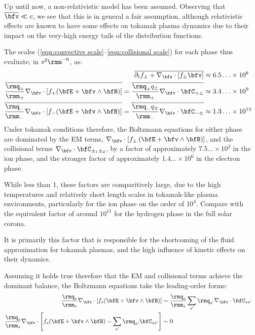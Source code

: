     \begin{remark}
        Up until now, a non-relativistic model has been assumed. Observing that $\overline{\bfv}  \ll  c$, we see that this is in general a fair assumption, although relativistic effects are known to have some effects on tokamak plasma dynamics due to their impact on the very-high energy tails of the distribution functions.
    \end{remark}
    
    The scales (\ref{eqn:convective scale}--\ref{eqn:collisional scale}) for each phase thus evaluate, in $s^{2}\rmm^{- 6}$, as:
    \begin{align}
        \overline{\partial_{t}f_{\pm} + \nabla_{\bfx}\cdot[f_{\pm}\bfv]}  &\approx  6.5\ldots\times 10^{6}  \\
        \overline{\frac{\rmq_{+}}{\rmm_{+}}\nabla_{\bfv}\cdot[f_{+}(\bfE + \bfv\wedge\bfB)]}  =  \overline{\frac{\rmq_{+}q_{\pm}}{\rmm_{+}}\nabla_{\bfv}\cdot\bfC_{+\pm}}  &\approx  3.4\ldots\times 10^{9}  \\
        \overline{\frac{\rmq_{-}}{\rmm_{-}}\nabla_{\bfv}\cdot[f_{-}(\bfE + \bfv\wedge\bfB)]}  =  \overline{\frac{\rmq_{-}q_{\pm}}{\rmm_{-}}\nabla_{\bfv}\cdot\bfC_{-\pm}}  &\approx  1.3\ldots\times 10^{13}
    \end{align}
    Under tokamak conditions therefore, the Boltzmann equations for either phase are dominated by the EM terms, $\nabla_{\bfv}\cdot[f_{\pm}\left(\bfE + \bfv\wedge\bfB\right)]$, and the collisional terms $\nabla_{\bfv}\cdot\bfC_{\pm_{1}\pm_{2}}$, by a factor of approximately $7.5\ldots\times 10^{2}$ in the ion phase, and the stronger factor of approximately $1.4\ldots\times 10^{6}$ in the electron phase. 

    \begin{remark}
        While less than 1, these factors are comparitively large, due to the high temperatures and relatively short length scales in tokamak-like plasma environments, particularly for the ion phase on the order of $10^{3}$. Compare with the equivalent factor of around $10^{11}$ for the hydrogen phase in the full solar corona.

        It is primarily this factor that is responsible for the shortcoming of the fluid approximation for tokamak plasmas, and the high influence of kinetic effects on their dynamics.
    \end{remark}

    Assuming it holds true therefore that the EM and collisional terms achieve the dominant balance, the Boltzmann equations take the leading-order forms:
    \begin{align}\label{eqn:leading-order Boltzmann equation}
        \frac{\rmq_{s}}{\rmm_{s}}\nabla_{\bfv}\cdot[f_{s}(\bfE + \bfv\wedge\bfB)]  &\sim  \frac{\rmq_{s}}{\rmm_{s}}\sum_{s'}\rmq_{s'}\nabla_{\bfv}\cdot\bfC_{ss'}  \\
        \frac{\rmq_{s}}{\rmm_{s}}\nabla_{\bfv}\cdot\left[f_{s}(\bfE + \bfv\wedge\bfB) - \sum_{s'}\rmq_{s'}\bfC_{ss'}\right]  &\sim  0
    \end{align}
    